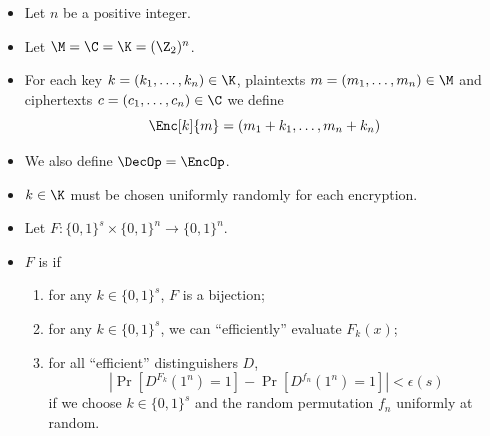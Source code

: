 \begin{frame}
  \begin{example}
    \begin{itemize}
      \item Let \(n\) be a positive integer.
      \item Let \(\M = \C = \K = (\Z_2)^n\).

        \pause{}

      \item For each key \(k = (k_1, \ldots, k_n)\in \K\), plaintexts \(m 
          = (m_1, \ldots, m_n)\in \M\) and ciphertexts \(c = (c_1, \ldots, 
          c_n)\in \C\) we define
        \[\Enc[k]{m} = (m_1 + k_1, \ldots, m_n + k_n)\]

        \pause{}

      \item We also define \(\DecOp = \EncOp\).

        \pause{}

      \item \(k\in \K\) must be chosen uniformly randomly for each encryption.
    \end{itemize}
  \end{example}
\end{frame}

\begin{frame}
  \begin{definition}
    \begin{itemize}
      \item Let \(F\colon \{0,1\}^s\times \{0, 1\}^n\to \{0,1\}^n\).

        \pause{}

      \item \(F\) is  if
        \begin{enumerate}
          \item for any \(k\in \{0, 1\}^s\), \(F\) is a bijection;

            \pause{}

          \item for any \(k\in \{0, 1\}^s\), we can \enquote{efficiently} 
            evaluate \(F_k(x)\);

            \pause{}

          \item for all \enquote{efficient} distinguishers \(D\),
            \[\left|\Pr[D^{F_k}(1^n) = 1] - \Pr[D^{f_n}(1^n) = 1]\right| 
              < \epsilon(s)\] if we choose \(k\in \{0,1\}^s\) and the random 
            permutation \(f_n\) uniformly at random.
        \end{enumerate}
    \end{itemize}
  \end{definition}
\end{frame}

